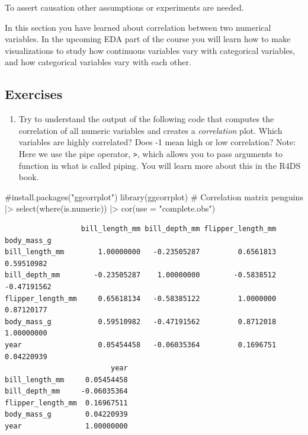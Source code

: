 \documentclass[
  letterpaper,
  DIV=11,
  numbers=noendperiod]{scrreprt}
\newenvironment{Shaded}{\begin{snugshade}}{\end{snugshade}}
\newcommand{\AttributeTok}[1]{\textcolor[rgb]{0.40,0.45,0.13}{#1}}
\newcommand{\CommentTok}[1]{\textcolor[rgb]{0.37,0.37,0.37}{#1}}
\newcommand{\FunctionTok}[1]{\textcolor[rgb]{0.28,0.35,0.67}{#1}}
\newcommand{\NormalTok}[1]{\textcolor[rgb]{0.00,0.23,0.31}{#1}}
\newcommand{\SpecialCharTok}[1]{\textcolor[rgb]{0.37,0.37,0.37}{#1}}
\newcommand{\StringTok}[1]{\textcolor[rgb]{0.13,0.47,0.30}{#1}}
\providecommand{\tightlist}{%
  \setlength{\itemsep}{0pt}\setlength{\parskip}{0pt}}\usepackage{longtable,booktabs,array}
\begin{document}
To assert causation other assumptions or experiments are needed.

In this section you have learned about correlation between two numerical
variables. In the upcoming EDA part of the course you will learn how to
make visualizations to study how continuous variables vary with
categorical variables, and how categorical variables vary with each
other.

\subsection{Exercises}\label{exercises-7}

\begin{enumerate}
\def\labelenumi{\arabic{enumi}.}
\tightlist
\item
  Try to understand the output of the following code that computes the
  correlation of all numeric variables and creates a \emph{correlation}
  plot. Which variables are highly correlated? Does -1 mean high or low
  correlation? Note: Here we use the pipe operator,
  \texttt{\textbar{}\textgreater{}}, which allows you to pass arguments
  to function in what is called piping. You will learn more about this
  in the R4DS book.
\end{enumerate}

\begin{Shaded}
\begin{Highlighting}[]
\CommentTok{\#install.packages("ggcorrplot")}
\FunctionTok{library}\NormalTok{(ggcorrplot)}
\CommentTok{\# Correlation matrix}
\NormalTok{penguins }\SpecialCharTok{|\textgreater{}}
  \FunctionTok{select}\NormalTok{(}\FunctionTok{where}\NormalTok{(is.numeric)) }\SpecialCharTok{|\textgreater{}}
  \FunctionTok{cor}\NormalTok{(}\AttributeTok{use =} \StringTok{"complete.obs"}\NormalTok{) }
\end{Highlighting}
\end{Shaded}

\begin{verbatim}
                  bill_length_mm bill_depth_mm flipper_length_mm body_mass_g
bill_length_mm        1.00000000   -0.23505287         0.6561813  0.59510982
bill_depth_mm        -0.23505287    1.00000000        -0.5838512 -0.47191562
flipper_length_mm     0.65618134   -0.58385122         1.0000000  0.87120177
body_mass_g           0.59510982   -0.47191562         0.8712018  1.00000000
year                  0.05454458   -0.06035364         0.1696751  0.04220939
                         year
bill_length_mm     0.05454458
bill_depth_mm     -0.06035364
flipper_length_mm  0.16967511
body_mass_g        0.04220939
year               1.00000000
\end{verbatim}
\end{document}
